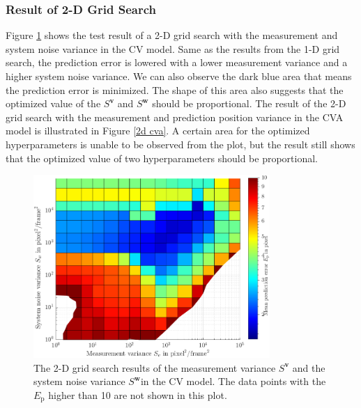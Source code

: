 \subsubsection{Result of 2-D Grid Search}


Figure \ref{2d cv} shows the test result of a 2-D grid search with the measurement and system noise variance in the CV model. Same as the results from the 1-D grid search, the prediction error is lowered with a lower measurement variance and a higher system noise variance. We can also observe the dark blue area that means the prediction error is minimized. The shape of this area also suggests that the optimized value of the $S^{\boldsymbol{v}}$ and $S^{\boldsymbol{w}}$ should be proportional. The result of the 2-D grid search with the measurement and prediction position variance in the CVA model is illustrated in Figure \ref{2d cva}. A certain area for the optimized hyperparameters is unable to be observed from the plot, but the result still shows that the optimized value of two hyperparameters should be proportional.

\begin{figure}[htbp]
\centering
\includegraphics[width=0.8\textwidth]{figures/KF/2d cv1.png}
\caption{The 2-D grid search results of the measurement variance $S^{\boldsymbol{v}}$ and the system noise variance $S^{\boldsymbol{w}}$in the CV model. The data points with the $E_{\mathrm{p}}$ higher than 10 are not shown in this plot.}
\label{2d cv}
\end{figure}

